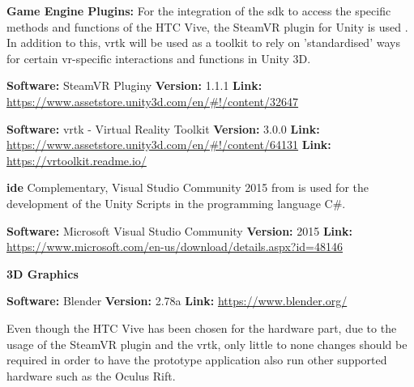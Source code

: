 \textbf{Game Engine Plugins:}
For the integration of the \gls{sdk} to access the specific methods and functions of the HTC Vive, the SteamVR plugin for Unity is used \citep{Valve2016a}.
In addition to this, \gls{vrtk} will be used as a toolkit to rely on 'standardised' ways for certain \gls{vr}-specific interactions and functions in Unity 3D.

\cite{Sysdia2017}

\textbf{Software:} SteamVR Pluginy \newline
\textbf{Version:} 1.1.1 \newline
\textbf{Link:} \url{https://www.assetstore.unity3d.com/en/#!/content/32647}


\textbf{Software:} \gls{vrtk} - Virtual Reality Toolkit \newline
\textbf{Version:} 3.0.0 \newline
\textbf{Link:} \url{https://www.assetstore.unity3d.com/en/#!/content/64131} \newline
\textbf{Link:} \url{https://vrtoolkit.readme.io/}


\textbf{\gls{ide}}
Complementary, Visual Studio Community 2015 from \cite{Microsoft2015} is used for the development of the Unity Scripts in the programming language C\#.

\textbf{Software:} Microsoft Visual Studio Community \newline
\textbf{Version:} 2015 \newline
\textbf{Link:} \url{https://www.microsoft.com/en-us/download/details.aspx?id=48146}
 

\textbf{3D Graphics}

\cite{Blender2016}

\textbf{Software:} Blender \newline
\textbf{Version:} 2.78a \newline
\textbf{Link:} \url{https://www.blender.org/}



Even though the HTC Vive has been chosen for the hardware part, due to the usage of the SteamVR plugin and the \gls{vrtk}, only little to none changes should be required in order to have the prototype application also run other supported hardware such as the Oculus Rift.



